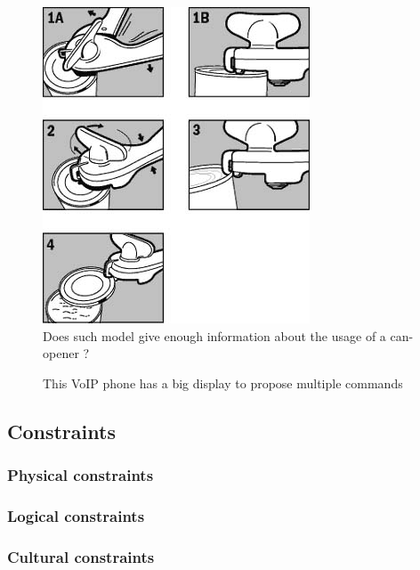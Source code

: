 \documentclass[a4paper,11pt] {article}
\theoremstyle{definition}
\begin{document}
 \begin{minipage}{\linewidth}
      \centering
      \begin{minipage}{0.45\linewidth}
          \begin{figure}[H]
          \centering
              \includegraphics[scale=0.4]{can-opener}
              \caption{Does such model give enough information about the usage of a can-opener ?}
          \end{figure}
      \end{minipage}
      \hspace{0.05\linewidth}
      \begin{minipage}{0.45\linewidth}
          \begin{figure}[H]
                    \centering
              \caption{This VoIP phone has a big display to propose multiple commands}
          \end{figure}
      \end{minipage}
  \end{minipage}

\subsection{Constraints}


\subsubsection{Physical constraints}
\subsubsection{Logical constraints}
\subsubsection{Cultural constraints}
\end{document}
